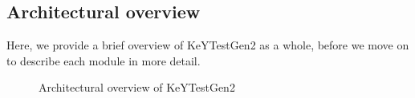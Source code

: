 \documentclass{article}
\newenvironment{tmparmod}[3]{\begin{list}{}{\setlength{\topsep}{0pt}\setlength{\leftmargin}{#1}\setlength{\rightmargin}{#2}\setlength{\parindent}{#3}\setlength{\listparindent}{\parindent}\setlength{\itemindent}{\parindent}\setlength{\parsep}{\parskip}} \item[]}{\end{list}}
\begin{document}
\subsection{Architectural overview}

Here, we provide a brief overview of KeYTestGen2 as a whole, before we move on
to describe each module in more detail.



\begin{tmparmod}{1cm}{0pt}{0pt}
  \begin{tmparmod}{0pt}{2cm}{0pt}
    \begin{tmparmod}{1cm}{0pt}{0pt}
      \begin{figure}[h]
        \caption{Architectural overview of KeYTestGen2}
      \end{figure}
    \end{tmparmod}
  \end{tmparmod}
\end{tmparmod}
\end{document}
